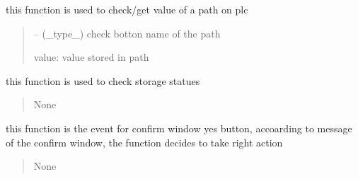 \documentclass[letterpaper,10pt,english]{sphinxmanual}
\begin{document}
\begin{savenotes}
\begin{fulllineitems}

\begin{savenotes}\begin{fulllineitems}
\label{\detokenize{setting/setting_api:oxin.setting_api.API.check_plc_parms}}
\pysigstartsignatures
{}
\pysigstopsignatures
\sphinxAtStartPar
this function is used to check/get value of a path on plc
\begin{quote}\begin{description}
\sphinxAtStartPar
{} – (\_type\_) check botton name of the path

\sphinxAtStartPar
value: value stored in path

\end{description}\end{quote}

\end{fulllineitems}\end{savenotes}


\begin{savenotes}\begin{fulllineitems}
\label{\detokenize{setting/setting_api:oxin.setting_api.API.check_storage_status}}
\pysigstartsignatures
{}
\pysigstopsignatures
\sphinxAtStartPar
this function is used to check storage statues
\begin{quote}\begin{description}
\sphinxAtStartPar
None

\end{description}\end{quote}

\end{fulllineitems}\end{savenotes}


\begin{savenotes}\begin{fulllineitems}
\label{\detokenize{setting/setting_api:oxin.setting_api.API.confirm_yes}}
\pysigstartsignatures
{}
\pysigstopsignatures
\sphinxAtStartPar
this function is the event for confirm window yes button,
accoarding to message of the confirm window, the function decides to take right action
\begin{quote}\begin{description}
\sphinxAtStartPar
None


\end{description}
\end{quote}
\end{fulllineitems}
\end{savenotes}
\end{fulllineitems}
\end{savenotes}
\end{document}
